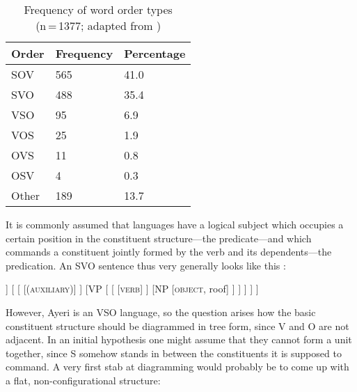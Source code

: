 \begin{table}[t]\centering
\caption[Frequency of word order types]{Frequency of word order types\\
	(n\,=\,1377; adapted from \cite{wals81})}

\begin{tabu} to .5\linewidth {B X[c] X[c]}
\toprule\tableheaderfont
Order
	& Frequency
	& Percentage
	\\

\toprule

SOV
	& 565
	& 41.0\pct
	\\

SVO
	& 488
	& 35.4\pct
	\\

VSO
	& 95
	& 6.9\pct
	\\

\midrule

VOS
	& 25
	& 1.9\pct
	\\

OVS
	& 11
	& 0.8\pct
	\\

OSV
	& 4
	& 0.3\pct
	\\

\midrule

Other
	& 189
	& 13.7\pct
	\\

\bottomrule
\end{tabu}

\label{tab:wordorderfreq}
\end{table}

It is commonly assumed that languages have a logical subject which occupies a
certain position in the constituent structure---the predicate---and which
commands a constituent jointly formed by the verb and its dependents---the
predication. An SVO sentence thus very generally looks like this
\parencite[compare the examples in][101--111]{bresnan2016}:

\ex\label{ex:basicsvo}
\begin{forest}
[IP
	[NP
		[\textsc{subject}, roof]
	]
	[
		[
			[\textsc{(auxiliary)}]
		]
		[VP
			[
				[
					[\textsc{verb}]
				]
				[NP
					[\textsc{object}, roof]
				]
			]
		]
	]
]
\end{forest}
\xe

However, Ayeri is an VSO language, so the question arises how the basic
constituent structure should be diagrammed in tree form, since V and O are not
adjacent. In an initial hypothesis one might assume that they cannot form a
unit together, since S somehow stands in between the constituents it is
supposed to command. A very first stab at diagramming would probably be to come
up with a flat, non-configurational structure:

